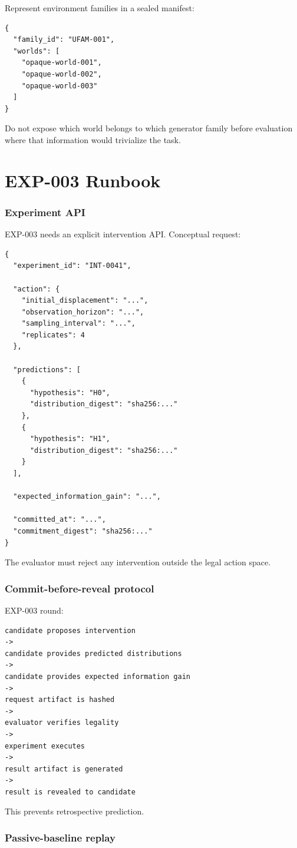 \documentclass[11pt]{article}
\begin{document}
Represent environment families in a sealed manifest:
\begin{verbatim}
{
  "family_id": "UFAM-001",
  "worlds": [
    "opaque-world-001",
    "opaque-world-002",
    "opaque-world-003"
  ]
}
\end{verbatim}
Do not expose which world belongs to which generator family before evaluation where that information would trivialize the task.

\part{EXP-003 Runbook}

\section{Experiment API}

EXP-003 needs an explicit intervention API. Conceptual request:
\begin{verbatim}
{
  "experiment_id": "INT-0041",

  "action": {
    "initial_displacement": "...",
    "observation_horizon": "...",
    "sampling_interval": "...",
    "replicates": 4
  },

  "predictions": [
    {
      "hypothesis": "H0",
      "distribution_digest": "sha256:..."
    },
    {
      "hypothesis": "H1",
      "distribution_digest": "sha256:..."
    }
  ],

  "expected_information_gain": "...",

  "committed_at": "...",
  "commitment_digest": "sha256:..."
}
\end{verbatim}
The evaluator must reject any intervention outside the legal action space.

\section{Commit-before-reveal protocol}

EXP-003 round:
\begin{verbatim}
candidate proposes intervention
->
candidate provides predicted distributions
->
candidate provides expected information gain
->
request artifact is hashed
->
evaluator verifies legality
->
experiment executes
->
result artifact is generated
->
result is revealed to candidate
\end{verbatim}
This prevents retrospective prediction.

\section{Passive-baseline replay}
\end{document}
